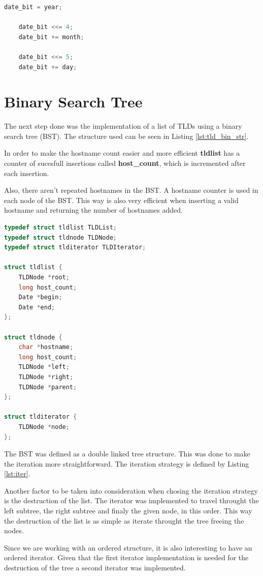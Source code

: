 \documentclass[twocolumn,10pt]{article}
\begin{document}
\begin{lstlisting}[language=C, caption={Assemble of date\_{}bit}, label=lst:date_bit]
	date_bit = year;
	
	date_bit <<= 4;
	date_bit += month;

	date_bit <<= 5;
	date_bit += day;
\end{lstlisting}

\section{Binary Search Tree}

The next step done was the implementation of a list of TLDs using a binary search tree (BST). The structure used can be seen in Listing \ref{lst:tld_bin_str}. 

In order to make the hostname count easier and more efficient \textbf{tldlist} has a counter of sucesfull insertions called \textbf{host\_{}count}, which is incremented after each insertion.

Also, there aren't repeated hostnames in the BST. A hostname counter is used in each node of the BST. This way is also very efficient when inserting a valid hostname and returning the number of hostnames added.

\begin{lstlisting}[language=C, caption={Structs of the TLD binary tree}, label=lst:tld_bin_str]
typedef struct tldlist TLDList;
typedef struct tldnode TLDNode;
typedef struct tlditerator TLDIterator;

struct tldlist {
	TLDNode *root;
	long host_count;
	Date *begin;
	Date *end;
};

struct tldnode {
	char *hostname;
	long host_count;
	TLDNode *left;
	TLDNode *right;
	TLDNode *parent;
};

struct tlditerator {
	TLDNode *node;
};
\end{lstlisting}

The BST was defined as a double linked tree structure. This was done to make the iteration more straightforward. The iteration strategy is defined by Listing \ref{lst:iter}.

Another factor to be taken into consideration when chosing the iteration strategy is the destruction of the list. The iterator was implemented to travel throught the left subtree, the right subtree and finaly the given node, in this order. This way the destruction of the list is as simple as iterate throught the tree freeing the nodes.

Since we are working with an ordered structure, it is also interesting to have an ordered iterator. Given that the first iterator implementation is needed for the destruction of the tree a second iterator was implemented.
\end{document}
